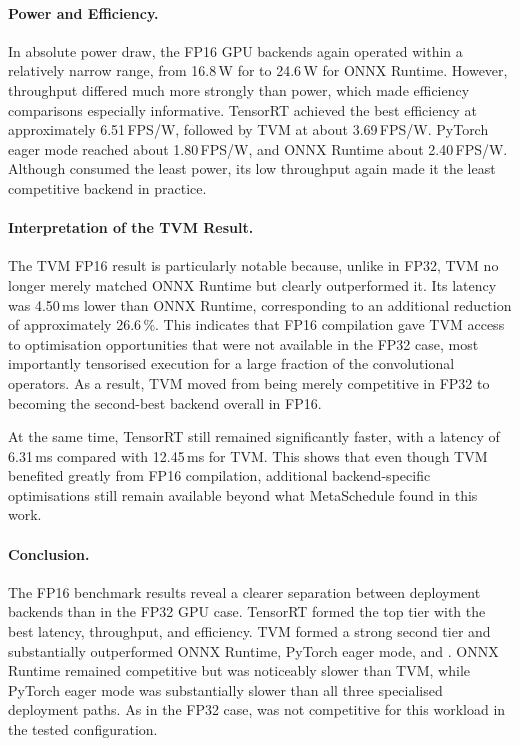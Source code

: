 \documentclass[12pt,a4paper]{report}
\begin{document}
\paragraph{Power and Efficiency.}
In absolute power draw, the FP16 GPU backends again operated within a
relatively narrow range, from 16.8\,W for  to 24.6\,W for
ONNX Runtime. However, throughput differed much more strongly than power, which
made efficiency comparisons especially informative. TensorRT achieved the best
efficiency at approximately 6.51\,FPS/W, followed by TVM at about 3.69\,FPS/W.
PyTorch eager mode reached about 1.80\,FPS/W, and ONNX Runtime about
2.40\,FPS/W. Although  consumed the least power, its low
throughput again made it the least competitive backend in practice.

\paragraph{Interpretation of the TVM Result.}
The TVM FP16 result is particularly notable because, unlike in FP32, TVM no
longer merely matched ONNX Runtime but clearly outperformed it. Its latency was
4.50\,ms lower than ONNX Runtime, corresponding to an additional reduction of
approximately 26.6\,\%. This indicates that FP16 compilation gave TVM access to
optimisation opportunities that were not available in the FP32 case, most
importantly tensorised execution for a large fraction of the convolutional
operators. As a result, TVM moved from being merely competitive in FP32 to
becoming the second-best backend overall in FP16.

At the same time, TensorRT still remained significantly faster, with a latency
of 6.31\,ms compared with 12.45\,ms for TVM. This shows that even though TVM
benefited greatly from FP16 compilation, additional backend-specific
optimisations still remain available beyond what MetaSchedule found in this
work.

\paragraph{Conclusion.}
The FP16 benchmark results reveal a clearer separation between deployment
backends than in the FP32 GPU case. TensorRT formed the top tier with the best
latency, throughput, and efficiency. TVM formed a strong second tier and
substantially outperformed ONNX Runtime, PyTorch eager mode, and
. ONNX Runtime remained competitive but was noticeably
slower than TVM, while PyTorch eager mode was substantially slower than all
three specialised deployment paths. As in the FP32 case, 
was not competitive for this workload in the tested configuration.
\end{document}
